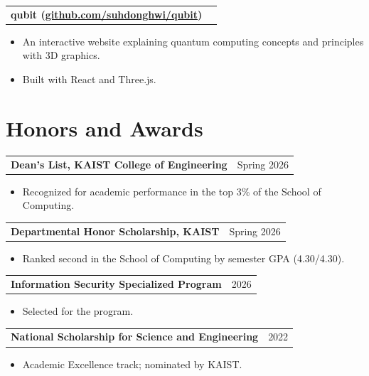 \documentclass[11pt,a4paper]{article}
\makeatletter
\newcommand{\project}[2]{%
  \begin{tabularx}{\textwidth}{@{}Xr@{}}
    \textbf{#1} & #2 \\
  \end{tabularx}\vspace{1pt}
}
\makeatother
\begin{document}
\project{qubit (\href{https://github.com/suhdonghwi/qubit}{github.com/suhdonghwi/qubit})}{}
\begin{itemize}
  \item An interactive website explaining quantum computing concepts and principles with 3D graphics.
  \item Built with React and Three.js.
\end{itemize}

\section{Honors and Awards}
\project{Dean's List, KAIST College of Engineering}{Spring 2026}
\begin{itemize}
  \item Recognized for academic performance in the top 3\% of the School of Computing.
\end{itemize}

\project{Departmental Honor Scholarship, KAIST}{Spring 2026}
\begin{itemize}
  \item Ranked second in the School of Computing by semester GPA (4.30/4.30).
\end{itemize}

\project{Information Security Specialized Program}{2026}
\begin{itemize}
  \item Selected for the program.
\end{itemize}

\project{National Scholarship for Science and Engineering}{2022}
\begin{itemize}
  \item Academic Excellence track; nominated by KAIST.
\end{itemize}
\end{document}
